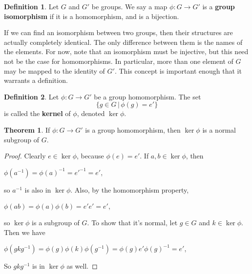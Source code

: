\documentclass[12pt]{article}
\newcommand{\inv}[1]{#1^{-1}}
\theoremstyle{definition}
\newtheorem{definition}{Definition}[section]
\newtheorem{theorem}{Theorem}[section]
\newenvironment{thm}
{\theoremstyle{definition}
\begin{theorem}}
{\end{theorem}}
\newenvironment{defn}[1][]
{\theoremstyle{definition}
\begin{definition}{}}
{\end{definition}}
\begin{document}
\begin{defn}
Let $G$ and $G'$ be groups. We say a map $\phi: G \to G'$ is a \textbf{group isomorphism} if it is a homomorphism, and is a bijection.
\end{defn}

If we can find an isomorphism between two groups, then their structures are actually completely identical. The only difference between them is the names of the elements. For now, note that an isomorphism must be injective, but this need not be the case for homomorphisms. In particular, more than one element of $G$ may be mapped to the identity of $G'$. This concept is important enough that it warrants a definition.

\begin{defn}
Let $\phi: G \to G'$ be a group homomorphism. The set
\begin{equation*}
    \{g \in G \,|\, \phi(g) = e'\}
\end{equation*}
is called the \textbf{kernel} of $\phi$, denoted $\ker \phi$.
\end{defn}

\begin{thm}
If $\phi: G \to G'$ is a group homomorphism, then $\ker\phi$ is a normal subgroup of $G$.
\end{thm}

\begin{proof}
Clearly $e \in \ker\phi$, because $\phi(e) = e'$. If $a, b \in \ker\phi$, then
\begin{center}
    $\phi(\inv a) = \inv{\phi(a)} = \inv{e'} = e'$,
\end{center}
so $\inv a$ is also in $\ker\phi$. Also, by the homomorphism property,
\begin{center}
    $\phi(ab) = \phi(a)\phi(b) = e'e' = e'$,
\end{center}
so $\ker\phi$ is a subgroup of $G$. To show that it's normal, let $g \in G$ and $k \in \ker\phi$. Then we have
\begin{center}
    $\phi(gk\inv g) = \phi(g)\phi(k)\phi(\inv g) = \phi(g) e' \inv{\phi(g)} = e'$,
\end{center}
So $gk\inv g$ is in $\ker\phi$ as well.

\end{proof}
\end{document}
